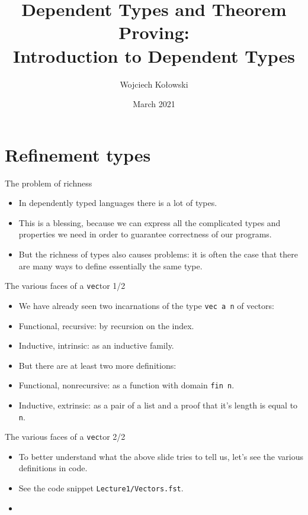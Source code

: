 \documentclass{beamer}
\title{Dependent Types and Theorem Proving: \\Introduction to Dependent Types}
\author{Wojciech Kołowski}
\date{March 2021}
\newcommand{\m}[1]{\texttt{#1}}
\begin{document}
\frame{\titlepage}
\frame{\tableofcontents}

\section{Refinement types}

\begin{frame}{The problem of richness}
\begin{itemize}
    \item In dependently typed languages there is a lot of types.
    \item This is a blessing, because we can express all the complicated types and properties we need in order to guarantee correctness of our programs.
    \item But the richness of types also causes problems: it is often the case that there are many ways to define essentially the same type.
\end{itemize}
\end{frame}

\begin{frame}{The various faces of a \m{vec}tor 1/2}
\begin{itemize}
    \item We have already seen two incarnations of the type \m{vec a n} of vectors:
    \item Functional, recursive: by recursion on the index.
    \item Inductive, intrinsic: as an inductive family.
    \item But there are at least two more definitions:
    \item Functional, nonrecursive: as a function with domain \m{fin n}.
    \item Inductive, extrinsic: as a pair of a list and a proof that it's length is equal to \m{n}.
\end{itemize}
\end{frame}

\begin{frame}{The various faces of a \m{vec}tor 2/2}
\begin{itemize}
    \item To better understand what the above slide tries to tell us, let's see the various definitions in code.
    \item See the code snippet \m{Lecture1/Vectors.fst}.
\end{itemize}
\end{frame}

\begin{frame}{}
\begin{itemize}
    \item 
\end{itemize}
\end{frame}
\end{document}
